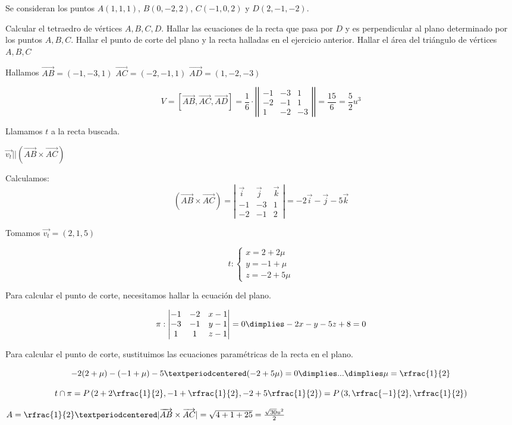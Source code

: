\documentclass[palatino,nosec,nochap,nobuilddate]{Docencia}
\renewcommand{\vec}[1]{\overrightarrow{#1}}
\begin{document}
\begin{problem}[3]
Se consideran los puntos $A(1,1,1)$, $B(0,-2,2)$, $C(-1,0,2)$ y $D(2,-1,-2)$.

\ppart Calcular el tetraedro de vértices $A,B,C,D$.
\ppart Hallar las ecuaciones de la recta que pasa por $D$ y es perpendicular al plano determinado por los puntos $A,B,C$.
\ppart Hallar el punto de corte del plano y la recta halladas en el ejercicio anterior.
\ppart Hallar el área del triángulo de vértices $A,B,C$

\solution

\spart 

Hallamos 
$\vec{AB} = (-1,-3,1)$
$\vec{AC} = (-2,-1,1)$
$\vec{AD} = (1,-2,-3)$

\[V = [\vec{AB},\vec{AC},\vec{AD}] = \frac{1}{6} ·\left|\left|\begin{matrix}-1&-3&1\\-2&-1&1\\1&-2&-3\end{matrix}\right|\right| = \frac{15}{6} = \frac{5}{2}u^3\]

\spart Llamamos $t$ a la recta buscada.

$\vec{v_t} || (\vec{AB}\times\vec{AC})$

Calculamos: \[
(\vec{AB}\times\vec{AC}) = 
\left|\begin{matrix}
\vec{i} & \vec{j} & \vec{k}\\
-1&-3&1\\
-2&-1&2
\end{matrix}\right| = -2\vec{i}-\vec{j}-5\vec{k} 
\]

Tomamos $\vec{v_t} = (2,1,5)$

\[
t:\begin{cases}
x = 2 + 2\mu\\
y = -1 + \mu\\
z = -2+5\mu
\end{cases}
\]

\spart Para calcular el punto de corte, necesitamos hallar la ecuación del plano.

\[\pi: \left|\begin{matrix}-1&-2&x-1\\-3&-1&y-1\\1&1&z-1\end{matrix}\right| = 0 \dimplies -2x-y-5z+8=0\]

Para calcular el punto de corte, sustituimos las ecuaciones paramétricas de la recta en el plano.

\[-2(2+\mu) -(-1+\mu) - 5·(-2+5\mu) = 0 \dimplies ... \dimplies \mu = \rfrac{1}{2}\]

\[t\cap \pi = P\left(2+2\rfrac{1}{2},-1+\rfrac{1}{2},-2+5\rfrac{1}{2}\right) = P\left(3,\rfrac{-1}{2},\rfrac{1}{2}\right)\]

\spart $A = \rfrac{1}{2}·|\vec{AB}\times\vec{AC}| = \sqrt{4+1+25} = \frac{\sqrt{30}u^2}{2}$

\end{problem}
\end{document}
